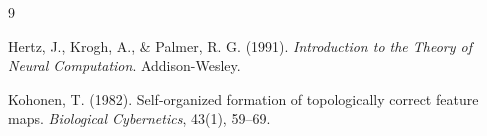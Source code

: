 \newpage

\begin{thebibliography}{9}

Hertz, J., Krogh, A., \& Palmer, R. G. (1991).
\textit{Introduction to the Theory of Neural Computation}.
Addison-Wesley.

Kohonen, T. (1982).
Self-organized formation of topologically correct feature maps.
\textit{Biological Cybernetics}, 43(1), 59–69.

\end{thebibliography}
